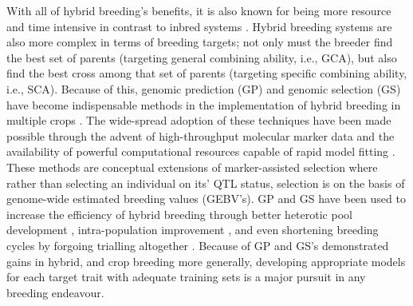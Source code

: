 With all of hybrid breeding's benefits, it is also known for being more resource and time intensive in contrast to inbred systems \parencite{Labroo2021}. Hybrid breeding systems are also more complex in terms of breeding targets; not only must the breeder find the best set of parents (targeting general combining ability, i.e., GCA), but also find the best cross among that set of parents (targeting specific combining ability, i.e., SCA). Because of this, genomic prediction (GP) and genomic selection (GS) have become indispensable methods in the implementation of hybrid breeding in multiple crops \parencite{Zhao2015a, Labroo2021}. The wide-spread adoption of these techniques have been made possible through the advent of high-throughput molecular marker data and the availability of powerful computational resources capable of rapid model fitting \parencite{Meuwissen2001, Bernardo2016}. These methods are conceptual extensions of marker-assisted selection where rather than selecting an individual on its' QTL status, selection is on the basis of genome-wide estimated breeding values (GEBV's). GP and GS have been used to increase the efficiency of hybrid breeding through better heterotic pool development \parencite{Rembe2019}, intra-population improvement \parencite{Gaynor2017}, and even shortening breeding cycles by forgoing trialling altogether \parencite{Heffner2010}. Because of GP and GS's demonstrated gains in hybrid, and crop breeding more generally, developing appropriate models for each target trait with adequate training sets is a major pursuit in any breeding endeavour. 

